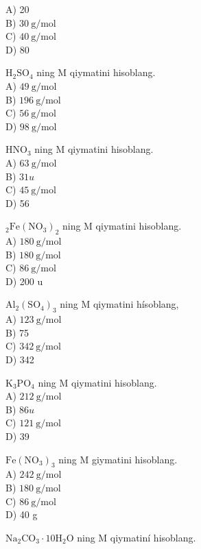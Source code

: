 A) 20\\
B) $30 \mathrm{~g} / \mathrm{mol}$\\
C) $40 \mathrm{~g} / \mathrm{mol}$\\
D) 80
  \item $\mathrm{H}_{2} \mathrm{SO}_{4}$ ning M qiymatini hisoblang.\\
A) $49 \mathrm{~g} / \mathrm{mol}$\\
B) $196 \mathrm{~g} / \mathrm{mol}$\\
C) $56 \mathrm{~g} / \mathrm{mol}$\\
D) $98 \mathrm{~g} / \mathrm{mol}$
  \item $\mathrm{HNO}_{3}$ ning M qiymatini hisoblang.\\
A) $63 \mathrm{~g} / \mathrm{mol}$\\
B) $31 u$\\
C) $45 \mathrm{~g} / \mathrm{mol}$\\
D) 56
  \item $_{2} \mathrm{Fe}\left(\mathrm{NO}_{3}\right)_{2}$ ning M qiymatini hisoblang.\\
A) $180 \mathrm{~g} / \mathrm{mol}$\\
B) $180 \mathrm{~g} / \mathrm{mol}$\\
C) $86 \mathrm{~g} / \mathrm{mol}$\\
D) 200 u
  \item $\mathrm{Al}_{2}\left(\mathrm{SO}_{4}\right)_{3}$ ning M qiymatini hísoblang,\\
A) $123 \mathrm{~g} / \mathrm{mol}$\\
B) 75\\
C) $342 \mathrm{~g} / \mathrm{mol}$\\
D) 342
  \item $\mathrm{K}_{3} \mathrm{PO}_{4}$ ning M qiymatini hisoblang.\\
A) $212 \mathrm{~g} / \mathrm{mol}$\\
B) $86 u$\\
C) $121 \mathrm{~g} / \mathrm{mol}$\\
D) 39
  \item $\mathrm{Fe}\left(\mathrm{NO}_{3}\right)_{3}$ ning M giymatini hisoblang.\\
A) $242 \mathrm{~g} / \mathrm{mol}$\\
B) $180 \mathrm{~g} / \mathrm{mol}$\\
C) $86 \mathrm{~g} / \mathrm{mol}$\\
D) 40 g
  \item $\mathrm{Na}_{2} \mathrm{CO}_{3} \cdot 10 \mathrm{H}_{2} \mathrm{O}$ ning M qiymatiní hisoblang.\\
